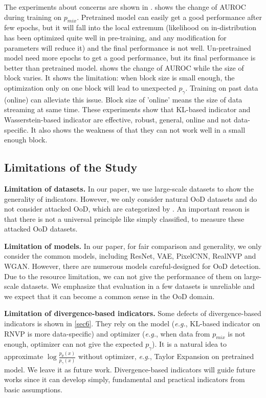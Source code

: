 \documentclass[letterpaper]{article} %
\newcommand{\EG}{\textit{e.g.}, }
\newcommand{\pmix}{p_{mix}}
\begin{document}
The experiments about concerns are shown in .  shows the change of AUROC during training on $\pmix$. Pretrained model can easily get a good performance after few epochs, but it will fall into the local extremum (likelihood on in-distribution has been optimized quite well in pre-training, and any modification for parameters will reduce it) and the final performance is not well. Un-pretrained model need more epochs to get a good performance, but its final performance is better than pretrained model. 
 shows the change of AUROC while the size of block varies. It shows the limitation: when block size is small enough, the optimization only on one block will lead to unexpected $p_\gamma$. Training on past data (online) can alleviate this issue. Block size of 'online' means the size of data streaming at same time.
These experiments show that KL-based indicator and Wasserstein-based indicator are effective, robust, general, online and not data-specific. It also shows the weakness of that they can not work well in a small enough block. 

\subsection{Limitations of the Study} 

\noindent \textbf{Limitation of datasets.}
In our paper, we use large-scale datasets to show the generality of indicators. However, we only consider natural OoD datasets and do not consider attacked OoD, which are categorized by \cite{chen2020robust}. An important reason is that there is not a universal principle like simply classified, to measure these attacked OoD datasets. 

\noindent \textbf{Limitation of models.} 
In our paper, for fair comparison and generality, we only consider the common models, including ResNet, VAE, PixelCNN, RealNVP and WGAN. However, there are numerous models careful-designed for OoD detection. Due to the resource limitation, we can not give the performance of them on large-scale datasets. We emphasize that evaluation in a few datasets is unreliable and we expect that it can become a common sense in the OoD domain. 

\noindent \textbf{Limitation of divergence-based indicators.} 
Some defects of divergence-based indicators is shown in \cref{sec6}. They rely on the model (\EG KL-based indicator on RNVP is more data-specific) and optimizer (\EG when data from $\pmix$ is not enough, optimizer can not give the expected $p_\gamma$). It is a natural idea to approximate $\log \frac{ p_\theta(x)}{p_\gamma(x)}$ without optimizer, \EG Taylor Expansion on pretrained model. We leave it as future work. 
Divergence-based indicators will guide future works since it can develop simply, fundamental and practical indicators from basic assumptions. 
\end{document}
